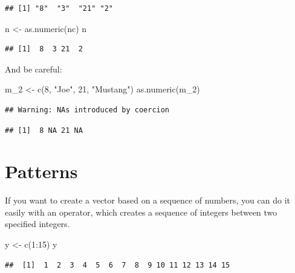 \documentclass[
]{book}
\newenvironment{Shaded}{\begin{snugshade}}{\end{snugshade}}
\newcommand{\DecValTok}[1]{\textcolor[rgb]{0.00,0.00,0.81}{#1}}
\newcommand{\FunctionTok}[1]{\textcolor[rgb]{0.00,0.00,0.00}{#1}}
\newcommand{\NormalTok}[1]{#1}
\newcommand{\OtherTok}[1]{\textcolor[rgb]{0.56,0.35,0.01}{#1}}
\newcommand{\SpecialCharTok}[1]{\textcolor[rgb]{0.00,0.00,0.00}{#1}}
\newcommand{\StringTok}[1]{\textcolor[rgb]{0.31,0.60,0.02}{#1}}
\begin{document}
\begin{verbatim}
## [1] "8"  "3"  "21" "2"
\end{verbatim}

\begin{Shaded}
\begin{Highlighting}[]
\NormalTok{n }\OtherTok{\textless{}{-}} \FunctionTok{as.numeric}\NormalTok{(nc)}
\NormalTok{n}
\end{Highlighting}
\end{Shaded}

\begin{verbatim}
## [1]  8  3 21  2
\end{verbatim}

And be careful:

\begin{Shaded}
\begin{Highlighting}[]
\NormalTok{m\_2 }\OtherTok{\textless{}{-}} \FunctionTok{c}\NormalTok{(}\DecValTok{8}\NormalTok{, }\StringTok{"Joe"}\NormalTok{, }\DecValTok{21}\NormalTok{, }\StringTok{"Mustang"}\NormalTok{)}
\FunctionTok{as.numeric}\NormalTok{(m\_2)}
\end{Highlighting}
\end{Shaded}

\begin{verbatim}
## Warning: NAs introduced by coercion
\end{verbatim}

\begin{verbatim}
## [1]  8 NA 21 NA
\end{verbatim}

\hypertarget{patterns}{%
\section{Patterns}\label{patterns}}

If you want to create a vector based on a sequence of numbers, you can do it easily with an operator, which creates a sequence of integers between two specified integers.

\begin{Shaded}
\begin{Highlighting}[]
\NormalTok{y }\OtherTok{\textless{}{-}} \FunctionTok{c}\NormalTok{(}\DecValTok{1}\SpecialCharTok{:}\DecValTok{15}\NormalTok{)}
\NormalTok{y}
\end{Highlighting}
\end{Shaded}

\begin{verbatim}
##  [1]  1  2  3  4  5  6  7  8  9 10 11 12 13 14 15
\end{verbatim}
\end{document}
